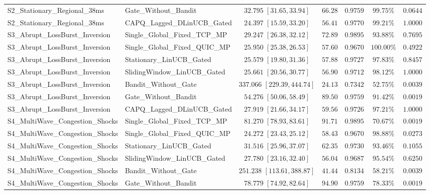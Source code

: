 \documentclass[10pt,journal,compsoc]{IEEEtran}
\begin{document}
\begin{table}[!t]
\begin{adjustbox}{max width=\textwidth}
\begin{tabular}{@{}llccccc@{}}
S2\_Stationary\_Regional\_38ms & Gate\_Without\_Bandit & $32.795$ $[31.65, 33.94]$ & $66.28$ & $0.9759$ & $99.75\%$ & $0.0644$ \\
S2\_Stationary\_Regional\_38ms & CAPQ\_Lagged\_DLinUCB\_Gated & $24.397$ $[15.59, 33.20]$ & $56.41$ & $0.9770$ & $99.21\%$ & $1.0000$ \\
S3\_Abrupt\_LossBurst\_Inversion & Single\_Global\_Fixed\_TCP\_MP & $29.247$ $[26.38, 32.12]$ & $72.89$ & $0.9895$ & $93.88\%$ & $0.7695$ \\
S3\_Abrupt\_LossBurst\_Inversion & Single\_Global\_Fixed\_QUIC\_MP & $25.950$ $[25.38, 26.53]$ & $57.60$ & $0.9670$ & $100.00\%$ & $0.4922$ \\
S3\_Abrupt\_LossBurst\_Inversion & Stationary\_LinUCB\_Gated & $25.579$ $[19.80, 31.36]$ & $57.88$ & $0.9727$ & $97.83\%$ & $0.8457$ \\
S3\_Abrupt\_LossBurst\_Inversion & SlidingWindow\_LinUCB\_Gated & $25.661$ $[20.56, 30.77]$ & $56.90$ & $0.9712$ & $98.12\%$ & $1.0000$ \\
S3\_Abrupt\_LossBurst\_Inversion & Bandit\_Without\_Gate & $337.066$ $[229.39, 444.74]$ & $24.13$ & $0.7342$ & $52.75\%$ & $0.0039$ \\
S3\_Abrupt\_LossBurst\_Inversion & Gate\_Without\_Bandit & $54.276$ $[50.06, 58.49]$ & $89.50$ & $0.9759$ & $91.42\%$ & $0.0019$ \\
S3\_Abrupt\_LossBurst\_Inversion & CAPQ\_Lagged\_DLinUCB\_Gated & $27.919$ $[21.66, 34.17]$ & $59.56$ & $0.9726$ & $97.21\%$ & $1.0000$ \\
S4\_MultiWave\_Congestion\_Shocks & Single\_Global\_Fixed\_TCP\_MP & $81.270$ $[78.93, 83.61]$ & $91.71$ & $0.9895$ & $70.67\%$ & $0.0019$ \\
S4\_MultiWave\_Congestion\_Shocks & Single\_Global\_Fixed\_QUIC\_MP & $24.272$ $[23.43, 25.12]$ & $58.43$ & $0.9670$ & $98.88\%$ & $0.0273$ \\
S4\_MultiWave\_Congestion\_Shocks & Stationary\_LinUCB\_Gated & $31.516$ $[25.96, 37.07]$ & $62.35$ & $0.9730$ & $93.46\%$ & $0.1055$ \\
S4\_MultiWave\_Congestion\_Shocks & SlidingWindow\_LinUCB\_Gated & $27.780$ $[23.16, 32.40]$ & $56.04$ & $0.9687$ & $95.54\%$ & $0.6250$ \\
S4\_MultiWave\_Congestion\_Shocks & Bandit\_Without\_Gate & $251.238$ $[113.61, 388.87]$ & $41.44$ & $0.8134$ & $58.21\%$ & $0.0039$ \\
S4\_MultiWave\_Congestion\_Shocks & Gate\_Without\_Bandit & $78.779$ $[74.92, 82.64]$ & $94.90$ & $0.9759$ & $78.33\%$ & $0.0019$ \\

\end{tabular}
\end{adjustbox}
\end{table}
\end{document}
